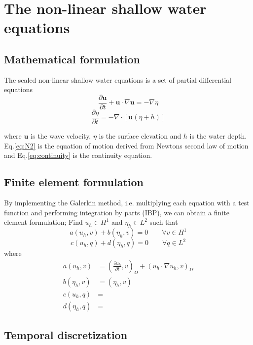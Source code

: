 \documentclass[11pt]{report}
\begin{document}
\chapter*{The non-linear shallow water equations}

\section*{Mathematical formulation}

The scaled non-linear shallow water equations is a set of partial 
differential equations 
\begin{equation}
\frac{\partial \mathbf{u}}{\partial t} + \mathbf{u}\cdot\nabla\mathbf{u} = -\nabla \eta
\label{eq:N2}
\end{equation}
\begin{equation}
\frac{\partial \eta}{\partial t} = -\nabla\cdot\left[\mathbf{u}\left(\eta + h\right)\right]
\label{eq:continuity}
\end{equation}

\noindent where $\mathbf{u}$ is the wave velocity, $\eta$ is the surface elevation
and $h$ is the water depth. Eq.\ref{eq:N2} is the equation of motion derived from Newtons
second law of motion and Eq.\ref{eq:continuity} is the continuity equation.


\section*{Finite element formulation}

By implementing the Galerkin method, i.e. multiplying each equation with a test function
and performing integration by parts (IBP), we can obtain a finite element formulation;
Find $u_h\in H^1$ and $\eta _h\in L^2$ such that
\begin{equation}
a(u_h, v) + b(\eta_h, v) = 0 \qquad \forall v \in H^1
\end{equation}
\begin{equation}
c(u_h, q) + d(\eta_h, q) = 0 \qquad \forall q \in L^2
\end{equation}
\noindent where
\begin{equation}
\begin{split}
a(u_h, v) &= \left(\frac{\partial u_h}{\partial t}, v \right)_\Omega + \left(u_h\cdot\nabla u_h, v \right)_\Omega \\
b(\eta _h, v) &= \left(\eta _h, v\right) \\
c(u_h, q) &=  \\
d(\eta_h, q) &=
\end{split}
\end{equation}


\section*{Temporal discretization}
\end{document}
